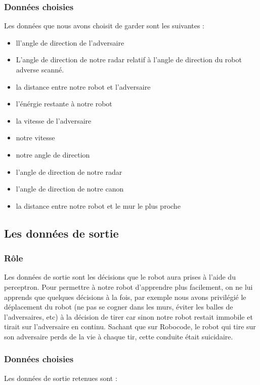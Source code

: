 \documentclass[12pt]{article}
\begin{document}
\subsubsection{Données choisies}
Les données que nous avons choisit de garder sont les suivantes :

\begin{itemize}
\item ll'angle de direction de l'adversaire
\item L'angle de direction de notre radar relatif à l'angle de direction du robot adverse
scanné.
\item la distance entre notre robot et l'adversaire
\item l'énérgie restante à notre robot
\item la vitesse de l'adversaire
\item notre vitesse
\item notre angle de direction
\item l'angle de direction de notre radar
\item l'angle de direction de notre canon
\item la distance entre notre robot et le mur le plus proche
\end{itemize}

\subsection{Les données de sortie}

\subsubsection{Rôle}
Les données de sortie sont les décisions que le robot aura prises à l'aide du perceptron. Pour permettre à notre robot d'apprendre plus facilement, on ne lui apprends que quelques décisions à la fois, par exemple nous avons privilégié le déplacement du robot (ne pas se cogner dans les murs, éviter les balles de l'adversaires, etc) à la décision de tirer car sinon notre robot restait immobile et tirait sur l'adversaire en continu. Sachant que sur Robocode, le robot qui tire sur son adversaire perds de la vie à chaque tir, cette conduite était suicidaire.

\subsubsection{Données choisies}
Les données de sortie retenues sont :
\end{document}
